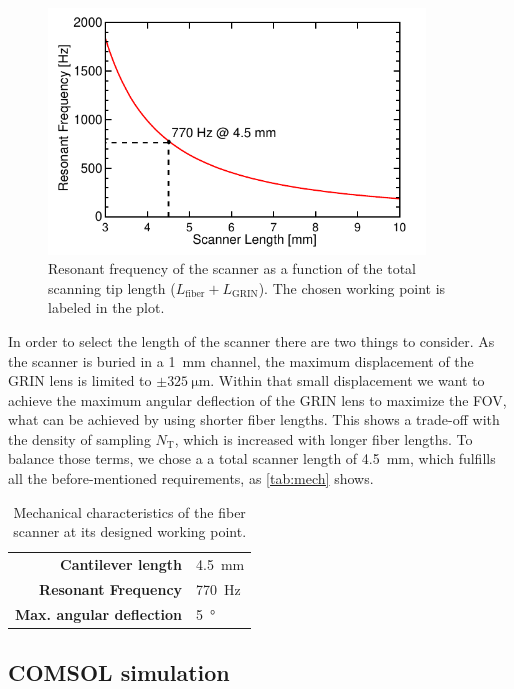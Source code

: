 \begin{figure}[h!]\centering
      \includegraphics[width=10cm]{figures/30_DesignSimulation/Mechanical/fres/fres.pdf}
      \caption{Resonant frequency of the scanner as a function of the total scanning tip length ($L_\mathrm{fiber} + L_\mathrm{GRIN}$). The chosen working point is labeled in the plot.}
      \label{fig:freq}
\end{figure}

In order to select the length of the scanner there are two things to consider. As the scanner is buried in a \SI{1}{\milli\meter} channel, the maximum displacement of the GRIN lens is limited to $\pm\SI{325}{\micro\meter}$. Within that small displacement we want to achieve the maximum angular deflection of the GRIN lens to maximize the FOV, what can be achieved by using shorter fiber lengths. This shows a trade-off with the density of sampling $N_\mathrm{T}$, which is increased with longer fiber lengths. To balance those terms, we chose a a total scanner length of \SI{4.5}{\milli\meter}, which fulfills all the before-mentioned requirements, as \autoref{tab:mech} shows. 

\begin{table}[h!]\centering
	\begin{tabular}{rl}\\
		\hline
		\textbf{Cantilever length} & \SI{4.5}{\milli\meter} \\ 
		\textbf{Resonant Frequency} & \SI{770}{\hertz} \\ 
		\textbf{Max. angular deflection} & \SI{5}{\degree} \\ 
		\hline
	\end{tabular} 
    \caption{Mechanical characteristics of the fiber scanner at its designed working point.}
    \label{tab:mech}
\end{table}

\subsection{COMSOL simulation}


